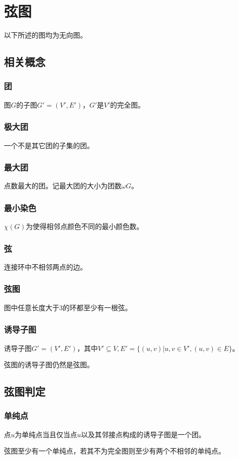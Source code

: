 \section{弦图}
以下所述的图均为无向图。
\subsection{相关概念}
\subsubsection{团}
图$G$的子图$G'=(V',E')$，$G'$是$V'$的完全图。
\subsubsection{极大团}
一个不是其它团的子集的团。
\subsubsection{最大团}
点数最大的团。记最大团的大小为团数$\omega{G}$。
\subsubsection{最小染色}
$\chi(G)$为使得相邻点颜色不同的最小颜色数。
\subsubsection{弦}
连接环中不相邻两点的边。
\subsubsection{弦图}
图中任意长度大于3的环都至少有一根弦。
\subsubsection{诱导子图}
诱导子图$G'=(V',E')$，其中$V'\subseteq V,E'=\{(u,v)|u,v\in V',(u,v)\in E\}$。
\begin{lemma}
    弦图的诱导子图仍然是弦图。
\end{lemma}
\subsection{弦图判定}
\subsubsection{单纯点}
点$u$为单纯点当且仅当点$u$以及其邻接点构成的诱导子图是一个团。
\begin{lemma}
    弦图至少有一个单纯点，若其不为完全图则至少有两个不相邻的单纯点。
\end{lemma}
